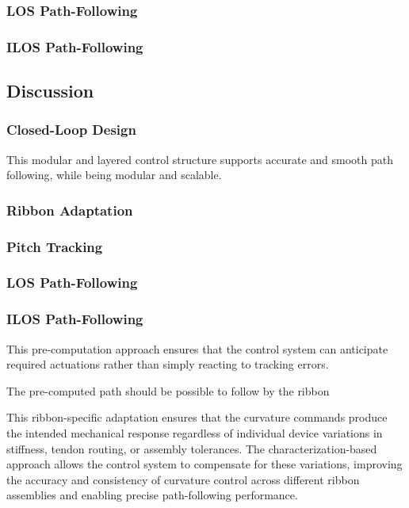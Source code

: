 \subsubsection{LOS Path-Following}

\subsubsection{ILOS Path-Following}


\subsection{Discussion}

\subsubsection{Closed-Loop Design}
This modular and layered control structure supports accurate and smooth path following, while being modular and scalable. 

\subsubsection{Ribbon Adaptation}


\subsubsection{Pitch Tracking}

\subsubsection{LOS Path-Following}

\subsubsection{ILOS Path-Following}

This pre-computation approach ensures that the control system can anticipate required actuations rather than simply reacting to tracking errors. 

The pre-computed path should be possible to follow by the ribbon

This ribbon-specific adaptation ensures that the curvature commands produce the intended mechanical response regardless of individual device variations in stiffness, tendon routing, or assembly tolerances. The characterization-based approach allows the control system to compensate for these variations, improving the accuracy and consistency of curvature control across different ribbon assemblies and enabling precise path-following performance.



